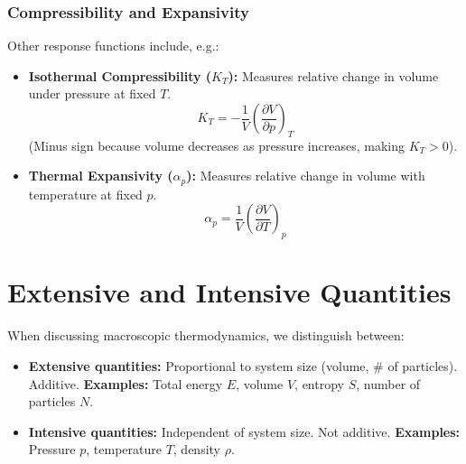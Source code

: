 \documentclass[11pt]{article}
\newcommand{\pderiv}[2]{\frac{\partial #1}{\partial #2}}
\begin{document}
\subsubsection*{Compressibility and Expansivity}
Other response functions include, e.g.:
\begin{itemize}
    \item \textbf{Isothermal Compressibility ($K_T$):} Measures relative change in volume under pressure at fixed $T$.
    \[ K_T = -\frac{1}{V} \left( \pderiv{V}{p} \right)_T \]
    (Minus sign because volume decreases as pressure increases, making $K_T > 0$).

    \item \textbf{Thermal Expansivity ($\alpha_p$):} Measures relative change in volume with temperature at fixed $p$.
    \[ \alpha_p = \frac{1}{V} \left( \pderiv{V}{T} \right)_p \]
\end{itemize}

\section*{Extensive and Intensive Quantities}

When discussing macroscopic thermodynamics, we distinguish between:
\begin{itemize}
    \item \textbf{Extensive quantities:} Proportional to system size (volume, \# of particles). Additive.
        \textbf{Examples:} Total energy $E$, volume $V$, entropy $S$, number of particles $N$.
    \item \textbf{Intensive quantities:} Independent of system size. Not additive.
        \textbf{Examples:} Pressure $p$, temperature $T$, density $\rho$.
\end{itemize}
\end{document}
